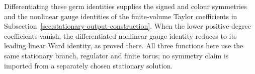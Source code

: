 Differentiating these germ identities supplies the signed and colour
symmetries and the nonlinear gauge identities of the finite-volume
Taylor coefficients in
Subsection~\ref{sec:stationary-output-construction}. When the lower
positive-degree coefficients vanish, the differentiated nonlinear
gauge identity reduces to its leading linear Ward identity, as proved
there. All three functions here use the same stationary branch,
regulator and finite torus; no symmetry claim is imported from a
separately chosen stationary solution.
